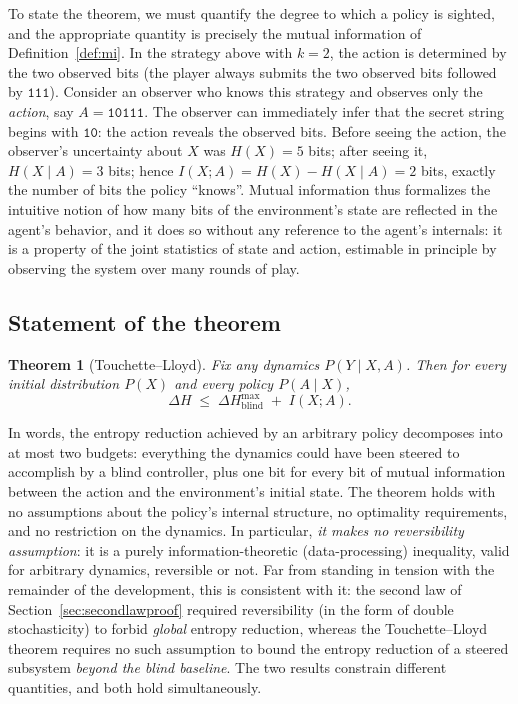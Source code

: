 \documentclass[10pt]{article}
\newtheorem{theorem}{Theorem}[section]
\theoremstyle{definition}
\theoremstyle{remark}
\begin{document}
To state the theorem, we must quantify the degree to which a policy is sighted, and the appropriate quantity is precisely the mutual information of Definition~\ref{def:mi}. In the strategy above with $k = 2$, the action is determined by the two observed bits (the player always submits the two observed bits followed by $\texttt{111}$). Consider an observer who knows this strategy and observes only the \emph{action}, say $A = \texttt{10111}$. The observer can immediately infer that the secret string begins with $\texttt{10}$: the action reveals the observed bits. Before seeing the action, the observer's uncertainty about $X$ was $H(X) = 5$ bits; after seeing it, $H(X \mid A) = 3$ bits; hence $I(X; A) = H(X) - H(X \mid A) = 2$ bits, exactly the number of bits the policy ``knows''. Mutual information thus formalizes the intuitive notion of how many bits of the environment's state are reflected in the agent's behavior, and it does so without any reference to the agent's internals: it is a property of the joint statistics of state and action, estimable in principle by observing the system over many rounds of play.

\subsection{Statement of the theorem}
\label{sec:tlthm}

\begin{theorem}[Touchette--Lloyd]
\label{thm:tl}
Fix any dynamics $P(Y \mid X, A)$. Then for every initial distribution $P(X)$ and every policy $P(A \mid X)$,
\[
\Delta H \;\le\; \Delta H^{\max}_{\mathrm{blind}} \;+\; I(X; A).
\]
\end{theorem}

In words, the entropy reduction achieved by an arbitrary policy decomposes into at most two budgets: everything the dynamics could have been steered to accomplish by a blind controller, plus one bit for every bit of mutual information between the action and the environment's initial state. The theorem holds with no assumptions about the policy's internal structure, no optimality requirements, and no restriction on the dynamics. In particular, \emph{it makes no reversibility assumption}: it is a purely information-theoretic (data-processing) inequality, valid for arbitrary dynamics, reversible or not. Far from standing in tension with the remainder of the development, this is consistent with it: the second law of Section~\ref{sec:secondlawproof} required reversibility (in the form of double stochasticity) to forbid \emph{global} entropy reduction, whereas the Touchette--Lloyd theorem requires no such assumption to bound the entropy reduction of a steered subsystem \emph{beyond the blind baseline}. The two results constrain different quantities, and both hold simultaneously.
\end{document}
